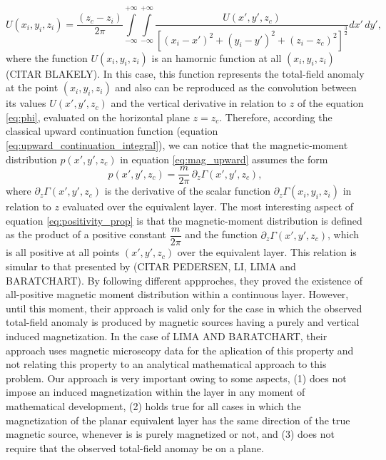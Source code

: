 \begin{equation}
U(x_i,y_i,z_i) = \dfrac{(z_c-z_i)}{2\pi} \int \limits_{-\infty}^{+\infty } \int \limits_{-\infty}^{+\infty }  \dfrac{U(x',y',z_c) }{[(x_i-x')^2 + (y_i-y')^2 + (z_i-z_c)^2]^{\frac{3}{2}}}    dx' \,dy',
\label{eq:upward_continuation_integral}
\end{equation}
where the function $U(x_i,y_i,z_i)$ is an hamornic function at all $(x_i,y_i,z_i)$ (CITAR BLAKELY). In this case, this function represents the total-field anomaly at the point $(x_i,y_i,z_i)$ and also can be reproduced as the convolution between its values $U(x',y',z_c)$ and the vertical derivative in relation to $z$ of the equation \ref{eq:phi}, evaluated on the horizontal plane $z=z_c$. Therefore, according the classical upward continuation function (equation \ref{eq:upward_continuation_integral}), we can notice that the magnetic-moment distribution $p(x',y',z_c)$ in equation \ref{eq:mag_upward} assumes the form 
\begin{equation}
p(x',y',z_c) = \dfrac{m}{2\pi} \, \partial_{z} \Gamma(x',y',z_c) ,
\label{eq:positivity_prop}
\end{equation}
where $\partial_{z} \Gamma(x',y',z_c)$ is the derivative of the scalar function $\partial_{z} \Gamma(x_i,y_i,z_i)$ in relation to $z$ evaluated over the equivalent layer. The most interesting aspect of equation \ref{eq:positivity_prop} is that the magnetic-moment distribution is defined as the product of a positive constant $\dfrac{m}{2\pi}$ and the function $\partial_{z} \Gamma(x',y',z_c)$, which is all positive at all points $(x',y',z_c)$ over the equivalent layer. This relation is simular to that presented by (CITAR PEDERSEN, LI, LIMA and BARATCHART). By following different appproches, they proved the existence of all-positive magnetic moment distribution within a continuous layer. However, until this moment, their approach is valid only for the case in which the observed total-field anomaly is produced by magnetic sources having a purely and vertical induced magnetization. In the case of LIMA AND BARATCHART, their approach uses magnetic microscopy data for the aplication of this property and not relating this property to an analytical mathematical approach to this problem. Our approach is very important owing to some aspects, (1) does not impose an induced magnetization within the layer in any moment of mathematical development, (2) holds true for all cases in which the magnetization of the planar equivalent layer has the same direction of the true magnetic source, whenever is is purely magnetized or not, and (3) does not require that the observed total-field anomay be on a plane.            
      
